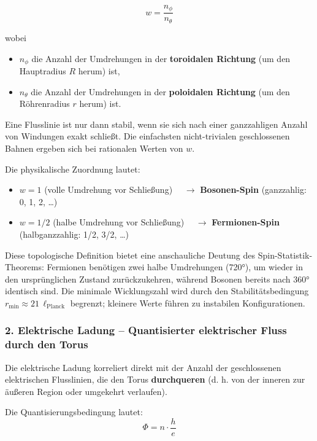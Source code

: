 	\begin{equation}
		w = \frac{n_\phi}{n_\theta}
		\label{eq:winding_number}
	\end{equation}
	
	wobei
	\begin{itemize}
		\item $n_\phi$ die Anzahl der Umdrehungen in der \textbf{toroidalen Richtung} (um den Hauptradius $R$ herum) ist,
		\item $n_\theta$ die Anzahl der Umdrehungen in der \textbf{poloidalen Richtung} (um den Röhrenradius $r$ herum) ist.
	\end{itemize}
	
	Eine Flusslinie ist nur dann stabil, wenn sie sich nach einer ganzzahligen Anzahl von Windungen exakt schließt. Die einfachsten nicht-trivialen geschlossenen Bahnen ergeben sich bei rationalen Werten von $w$.
	
	Die physikalische Zuordnung lautet:
	\begin{itemize}
		\item $w = 1$ \quad (volle Umdrehung vor Schließung) $\quad \to$ \textbf{Bosonen-Spin} (ganzzahlig: 0, 1, 2, …)
		\item $w = 1/2$ \quad (halbe Umdrehung vor Schließung) $\quad \to$ \textbf{Fermionen-Spin} (halbganzzahlig: 1/2, 3/2, …)
	\end{itemize}
	
	Diese topologische Definition bietet eine anschauliche Deutung des Spin-Statistik-Theorems: Fermionen benötigen zwei halbe Umdrehungen (720°), um wieder in den ursprünglichen Zustand zurückzukehren, während Bosonen bereits nach 360° identisch sind. Die minimale Wicklungszahl wird durch den Stabilitätsbedingung $r_{\min} \approx 21 \, \ell_{\text{Planck}}$ begrenzt; kleinere Werte führen zu instabilen Konfigurationen.
	
	\subsubsection{2. Elektrische Ladung – Quantisierter elektrischer Fluss durch den Torus}
	
	Die elektrische Ladung korreliert direkt mit der Anzahl der geschlossenen elektrischen Flusslinien, die den Torus \textbf{durchqueren} (d. h. von der inneren zur äußeren Region oder umgekehrt verlaufen).
	
	Die Quantisierungsbedingung lautet:
	\begin{equation}
		\Phi = n \cdot \frac{h}{e}
		\label{eq:flux_quantization}
	\end{equation}
	

